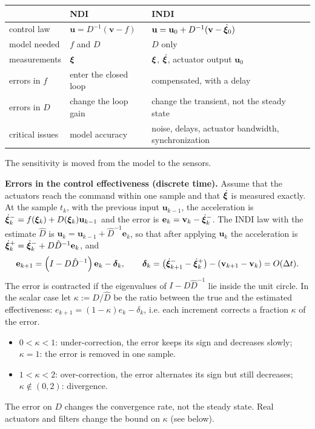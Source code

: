 \documentclass[10pt, a4paper]{report}
\begin{document}
\begin{table}[htbp]
  \centering
  \renewcommand{\arraystretch}{1.35}
  \begin{tabular}{p{2.3cm}p{4.0cm}p{4.4cm}}
    \toprule
    & \textbf{NDI} & \textbf{INDI}\\
    \midrule
    control law & $\mathbf u=D^{-1}(\mathbf v-f)$ & $\mathbf u=\mathbf u_0+D^{-1}(\mathbf v-\dot{{\boldsymbol{\xi}}}_0)$\\
    model needed & $f$ and $D$ & $D$ only\\
    measurements & ${\boldsymbol{\xi}}$ & ${\boldsymbol{\xi}}$, $\dot{{\boldsymbol{\xi}}}$, actuator output $\mathbf u_0$\\
    errors in $f$ & enter the closed loop & compensated, with a delay\\
    errors in $D$ & change the loop gain & change the transient, not the steady state\\
    critical issues & model accuracy & noise, delays, actuator bandwidth, synchronization\\
    \bottomrule
  \end{tabular}
\end{table}
\noindent The sensitivity is moved from the model to the sensors.\bigskip

\noindent\textbf{Errors in the control effectiveness (discrete time).} Assume that the actuators reach the command within one sample and that $\dot{{\boldsymbol{\xi}}}$ is measured exactly. At the sample $t_k$, with the previous input $\mathbf u_{k-1}$, the acceleration is $\dot{{\boldsymbol{\xi}}}_k^-=f({\boldsymbol{\xi}}_k)+D({\boldsymbol{\xi}}_k)\mathbf u_{k-1}$ and the error is $\mathbf e_k=\mathbf v_k-\dot{{\boldsymbol{\xi}}}_k^-$. The INDI law with the estimate $\hat D$ is $\mathbf u_k=\mathbf u_{k-1}+\hat D^{-1}\mathbf e_k$, so that after applying $\mathbf u_k$ the acceleration is $\dot{{\boldsymbol{\xi}}}_k^+=\dot{{\boldsymbol{\xi}}}_k^-+D\hat D^{-1}\mathbf e_k$, and
\begin{equation}
    \mathbf e_{k+1}=\left(I-D\hat D^{-1}\right)\mathbf e_k-\boldsymbol{\delta}_k,\qquad\boldsymbol{\delta}_k=\left(\dot{{\boldsymbol{\xi}}}_{k+1}^--\dot{{\boldsymbol{\xi}}}_k^+\right)-\left(\mathbf v_{k+1}-\mathbf v_k\right)=O(\Delta t).
\end{equation}
The error is contracted if the eigenvalues of $I-D\hat D^{-1}$ lie inside the unit circle. In the scalar case let $\kappa:=D/\hat D$ be the ratio between the true and the estimated effectiveness: $e_{k+1}=(1-\kappa)e_k-\delta_k$, i.e. each increment corrects a fraction $\kappa$ of the error.
\begin{itemize}
    \item $0<\kappa<1$: under-correction, the error keeps its sign and decreases slowly; $\kappa=1$: the error is removed in one sample.
    \item $1<\kappa<2$: over-correction, the error alternates its sign but still decreases; $\kappa\notin(0,2)$: divergence.
\end{itemize}
The error on $D$ changes the convergence rate, not the steady state. Real actuators and filters change the bound on $\kappa$ (see below).\bigskip
\end{document}
